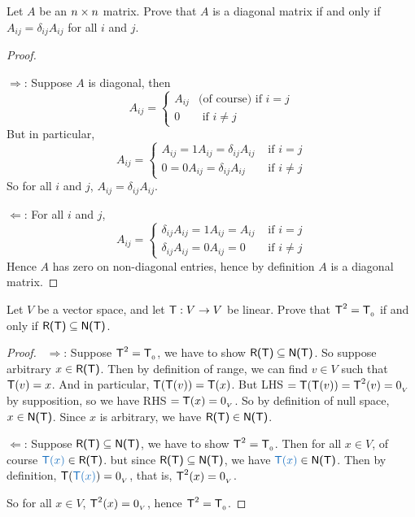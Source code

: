 \begin{exercise} \label{exercise 2.3.10}
Let \(A\) be an \(n \times n\) matrix.
Prove that \(A\) is a diagonal matrix if and only if \(A_{ij} = \delta_{ij} A_{ij}\) for all \(i\) and \(j\).
\end{exercise}

\begin{proof} \ 

\(\Longrightarrow\):
Suppose \(A\) is diagonal, then
\begin{equation*}
    A_{ij} = \begin{cases}
        A_{ij} & \text{(of course) if } i = j \\
        0 & \text{ if } i \ne j
    \end{cases}
\end{equation*}
But in particular,
\begin{equation*}
    A_{ij} = \begin{cases}
        A_{ij} = 1 A_{ij} = \delta_{ij} A_{ij} & \text{ if } i = j \\
        0 = 0 A_{ij} = \delta_{ij} A_{ij} & \text{ if } i \ne j
    \end{cases}
\end{equation*}
So for all \(i\) and \(j\), \(A_{ij} = \delta_{ij} A_{ij}\).

\(\Longleftarrow\):
For all \(i\) and \(j\),
\begin{equation*}
    A_{ij} = \begin{cases}
        \delta_{ij} A_{ij} = 1 A_{ij} = A_{ij} & \text{ if } i = j \\
        \delta_{ij} A_{ij} = 0 A_{ij} = 0 & \text{ if } i \ne j
    \end{cases}
\end{equation*}
Hence \(A\) has zero on non-diagonal entries, hence by definition \(A\) is a diagonal matrix.
\end{proof}

\begin{exercise} \label{exercise 2.3.11}
Let \(V\) be a vector space, and let \(\textsf{T} : V \to V\) be linear.
Prove that \(\textsf{T}^2 = \textsf{T}_{_0}\) if and only if \(\textsf{R(T)} \subseteq \textsf{N(T)}\).
\end{exercise}

\begin{proof} \ 
\(\Longrightarrow\): Suppose \(\textsf{T}^2 = \textsf{T}_{_0}\), we have to show \(\textsf{R(T)} \subseteq \textsf{N(T)}\).
So suppose arbitrary \(x \in \textsf{R(T)}\).
Then by definition of range, we can find \(v \in V\) such that \(\textsf{T}(v) = x\).
And in particular, \(\textsf{T}(\textsf{T}(v)) = \textsf{T}(x)\).
But LHS \(= \textsf{T}(\textsf{T}(v)) = \textsf{T}^2(v) = 0_{_V}\) by supposition, so we have RHS \(= \textsf{T}(x) = 0_{_V}\).
So by definition of null space, \(x \in \textsf{N(T)}\).
Since \(x\) is arbitrary, we have \(\textsf{R(T)} \in \textsf{N(T)}\).

\(\Longleftarrow\): Suppose \(\textsf{R(T)} \subseteq \textsf{N(T)}\), we have to show \(\textsf{T}^2 = \textsf{T}_{_0}\).
Then for all \(x \in V\), of course \(\BLUE{\T(x)} \in \RANGET\). but since \(\textsf{R(T)} \subseteq \textsf{N(T)}\), we have \(\BLUE{\T(x)} \in \NULLT\).
Then by definition, \(\T(\BLUE{\T(x)}) = \OV\), that is, \(\textsf{T}^2(x) = 0_{_V}\).

So for all \(x \in V\), \(\textsf{T}^2(x) = 0_{_V}\), hence \(\textsf{T}^2 = \textsf{T}_{_0}\).
\end{proof}

